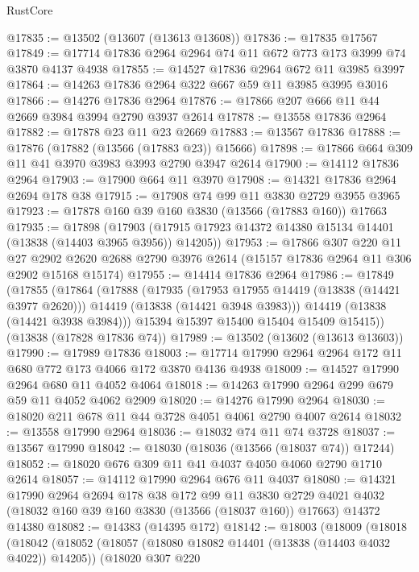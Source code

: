 \begin{lexlean}{RustCore}
\begin{coremodule}
@17835 := @13502 (@13607 (@13613 @13608))
@17836 := @17835 @17567
@17849 := @17714 @17836 @2964 @2964 @74 @11 @672 @773 @173 @3999 @74 @3870 @4137 @4938
@17855 := @14527 @17836 @2964 @672 @11 @3985 @3997
@17864 := @14263 @17836 @2964 @322 @667 @59 @11 @3985 @3995 @3016
@17866 := @14276 @17836 @2964
@17876 := @17866 @207 @666 @11 @44 @2669 @3984 @3994 @2790 @3937 @2614
@17878 := @13558 @17836 @2964
@17882 := @17878 @23 @11 @23 @2669
@17883 := @13567 @17836
@17888 := @17876 (@17882 (@13566 (@17883 @23)) @15666)
@17898 := @17866 @664 @309 @11 @41 @3970 @3983 @3993 @2790 @3947 @2614
@17900 := @14112 @17836 @2964
@17903 := @17900 @664 @11 @3970
@17908 := @14321 @17836 @2964 @2694 @178 @38
@17915 := @17908 @74 @99 @11 @3830 @2729 @3955 @3965
@17923 := @17878 @160 @39 @160 @3830 (@13566 (@17883 @160)) @17663
@17935 := @17898
    (@17903 (@17915 @17923 @14372 @14380 @15134 @14401 (@13838 (@14403 @3965 @3956)) @14205))
@17953 := @17866
    @307
    @220
    @11
    @27
    @2902
    @2620
    @2688
    @2790
    @3976
    @2614
    (@15157 @17836 @2964 @11 @306 @2902 @15168 @15174)
@17955 := @14414 @17836 @2964
@17986 := @17849
    (@17855
      (@17864
        (@17888
          (@17935
            (@17953 @17955 @14419 (@13838 (@14421 @3977 @2620)))
            @14419
            (@13838 (@14421 @3948 @3983)))
          @14419
          (@13838 (@14421 @3938 @3984)))
        @15394
        @15397
        @15400
        @15404
        @15409
        @15415))
    (@13838 (@17828 @17836 @74))
@17989 := @13502 (@13602 (@13613 @13603))
@17990 := @17989 @17836
@18003 := @17714 @17990 @2964 @2964 @172 @11 @680 @772 @173 @4066 @172 @3870 @4136 @4938
@18009 := @14527 @17990 @2964 @680 @11 @4052 @4064
@18018 := @14263 @17990 @2964 @299 @679 @59 @11 @4052 @4062 @2909
@18020 := @14276 @17990 @2964
@18030 := @18020 @211 @678 @11 @44 @3728 @4051 @4061 @2790 @4007 @2614
@18032 := @13558 @17990 @2964
@18036 := @18032 @74 @11 @74 @3728
@18037 := @13567 @17990
@18042 := @18030 (@18036 (@13566 (@18037 @74)) @17244)
@18052 := @18020 @676 @309 @11 @41 @4037 @4050 @4060 @2790 @1710 @2614
@18057 := @14112 @17990 @2964 @676 @11 @4037
@18080 := @14321
    @17990
    @2964
    @2694
    @178
    @38
    @172
    @99
    @11
    @3830
    @2729
    @4021
    @4032
    (@18032 @160 @39 @160 @3830 (@13566 (@18037 @160)) @17663)
    @14372
    @14380
@18082 := @14383 (@14395 @172)
@18142 := @18003
    (@18009
      (@18018
        (@18042
          (@18052
            (@18057 (@18080 @18082 @14401 (@13838 (@14403 @4032 @4022)) @14205))
            (@18020
              @307
              @220

\end{coremodule}
\end{lexlean}
